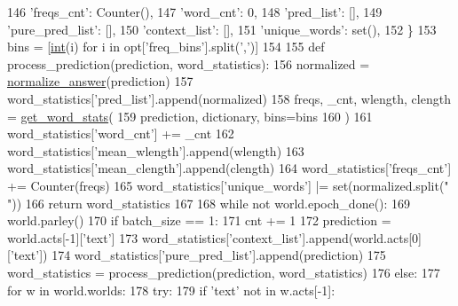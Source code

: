 \begin{DoxyCode}
146         \textcolor{stringliteral}{'freqs\_cnt'}: Counter(),
147         \textcolor{stringliteral}{'word\_cnt'}: 0,
148         \textcolor{stringliteral}{'pred\_list'}: [],
149         \textcolor{stringliteral}{'pure\_pred\_list'}: [],
150         \textcolor{stringliteral}{'context\_list'}: [],
151         \textcolor{stringliteral}{'unique\_words'}: set(),
152     \}
153     bins = [\hyperlink{namespacelanguage__model_1_1eval__ppl_a7d12ee00479673c5c8d1f6d01faa272a}{int}(i) \textcolor{keywordflow}{for} i \textcolor{keywordflow}{in} opt[\textcolor{stringliteral}{'freq\_bins'}].split(\textcolor{stringliteral}{','})]
154 
155     \textcolor{keyword}{def }process\_prediction(prediction, word\_statistics):
156         normalized = \hyperlink{namespaceparlai_1_1core_1_1metrics_ae7769a6b628f41081e0f43043d52031a}{normalize\_answer}(prediction)
157         word\_statistics[\textcolor{stringliteral}{'pred\_list'}].append(normalized)
158         freqs, \_cnt, wlength, clength = \hyperlink{namespaceprojects_1_1controllable__dialogue_1_1eval__wordstat_af8f7aeddab4a5c7f0a5597bdb09f40ae}{get\_word\_stats}(
159             prediction, dictionary, bins=bins
160         )
161         word\_statistics[\textcolor{stringliteral}{'word\_cnt'}] += \_cnt
162         word\_statistics[\textcolor{stringliteral}{'mean\_wlength'}].append(wlength)
163         word\_statistics[\textcolor{stringliteral}{'mean\_clength'}].append(clength)
164         word\_statistics[\textcolor{stringliteral}{'freqs\_cnt'}] += Counter(freqs)
165         word\_statistics[\textcolor{stringliteral}{'unique\_words'}] |= set(normalized.split(\textcolor{stringliteral}{" "}))
166         \textcolor{keywordflow}{return} word\_statistics
167 
168     \textcolor{keywordflow}{while} \textcolor{keywordflow}{not} world.epoch\_done():
169         world.parley()
170         \textcolor{keywordflow}{if} batch\_size == 1:
171             cnt += 1
172             prediction = world.acts[-1][\textcolor{stringliteral}{'text'}]
173             word\_statistics[\textcolor{stringliteral}{'context\_list'}].append(world.acts[0][\textcolor{stringliteral}{'text'}])
174             word\_statistics[\textcolor{stringliteral}{'pure\_pred\_list'}].append(prediction)
175             word\_statistics = process\_prediction(prediction, word\_statistics)
176         \textcolor{keywordflow}{else}:
177             \textcolor{keywordflow}{for} w \textcolor{keywordflow}{in} world.worlds:
178                 \textcolor{keywordflow}{try}:
179                     \textcolor{keywordflow}{if} \textcolor{stringliteral}{'text'} \textcolor{keywordflow}{not} \textcolor{keywordflow}{in} w.acts[-1]:

\end{DoxyCode}
